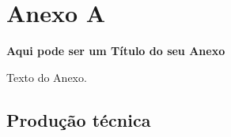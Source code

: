\chapter{Anexo A}
\label{an:a}
\begin{center}
    \textbf{Aqui pode ser um Título do seu Anexo}
\end{center}

Texto do Anexo.


\section{Produção técnica}

